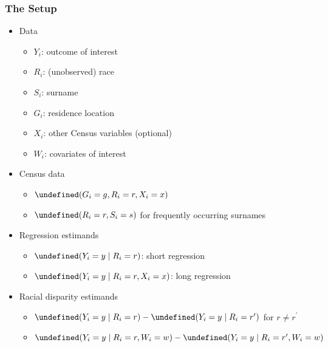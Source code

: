\documentclass[handout]{beamer}
\let\Pr\undefined
\DeclareMathOperator{\Pr}{\mathbb{P}}
\begin{document}
\begin{frame}

\frametitle{The Setup}

\begin{itemize}
\item Data
  \begin{itemize}
  \item $Y_i$: outcome of interest 
  \item $R_i$: (unobserved) race
  \item $S_i$: surname
  \item $G_i$: residence location
  \item $X_i$: other Census variables (optional)
  \item $W_i$: covariates of interest
  \end{itemize}
\item Census data
  \begin{itemize}
  \item $\Pr(G_i = g, R_i = r, X_i = x)$
  \item $\Pr(R_i = r, S_i =s)$ for frequently occurring surnames
  \end{itemize}

  \vfill
\item Regression estimands
  \begin{itemize}
  \item $\Pr(Y_i = y \mid R_i = r)$: short regression
  \item $\Pr(Y_i = y \mid R_i = r, X_i =x)$: long regression 
  \end{itemize}

\item Racial disparity estimands
  \begin{itemize}
  \item $\Pr(Y_i =y \mid R_i = r) - \Pr(Y_i = y \mid R_i = r^\prime)$ for $r
    \ne r^\prime$
  \item $\Pr(Y_i = y \mid R_i = r, W_i = w) - \Pr(Y_i = y \mid R_i = r^\prime, W_i = w)$
  \end{itemize}

\end{itemize}
  
\end{frame}
\end{document}
